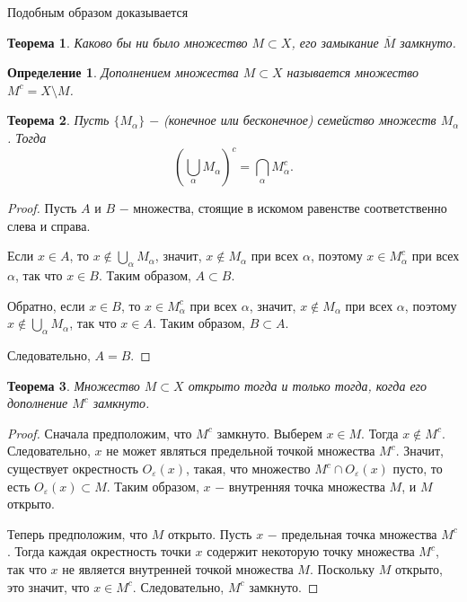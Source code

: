 \documentclass{article}
\newtheorem{theorem}{Теорема}[section]
\newtheorem{definition}{Определение}[section]
\begin{document}
Подобным образом доказывается

\begin{theorem}
Каково бы ни было множество \(M \subset X\), его замыкание \(\overline{M}\) замкнуто.
\end{theorem}

\begin{definition}
Дополнением множества \(M \subset X\) называется множество \(M^c = X \setminus M\).
\end{definition}

\begin{theorem}
Пусть \(\{M_\alpha\}\) \(-\) (конечное или бесконечное) семейство множеств \(M_\alpha\). Тогда
\[
\left(\bigcup\limits_{\alpha} M_\alpha\right)^c = \bigcap\limits_{\alpha}M_\alpha^c.
\]
\end{theorem}

\begin{proof}
Пусть \(A\) и \(B\) \(-\) множества, стоящие в искомом равенстве соответственно слева и справа.

Если \(x \in A\), то \(x \notin \bigcup\limits_{\alpha} M_\alpha\), значит, \(x \notin M_\alpha\) при всех \(\alpha\), поэтому \(x \in M_\alpha^c\) при всех \(\alpha\), так что \(x \in B\). Таким образом, \(A \subset B\).

Обратно, если \(x \in B\), то \(x \in M_\alpha^c\) при всех \(\alpha\), значит, \(x \notin M_\alpha\) при всех \(\alpha\), поэтому \(x \notin \bigcup\limits_{\alpha} M_\alpha\), так что \(x \in A\). Таким образом, \(B \subset A\).

Следовательно, \(A = B\).
\end{proof}

\begin{theorem}
Множество \(M \subset X\) открыто тогда и только тогда, когда его дополнение \(M^c\) замкнуто.
\end{theorem}

\begin{proof}
Сначала предположим, что \(M^c\) замкнуто. Выберем \(x \in M\). Тогда \(x \notin M^c\). Следовательно, \(x\) не может являться предельной точкой множества \(M^c\). Значит, существует окрестность \(O_\varepsilon(x)\), такая, что множество \(M^c \cap O_\varepsilon(x)\) пусто, то есть \(O_\varepsilon(x) \subset M\). Таким образом, \(x\) \(-\) внутренняя точка множества \(M\), и \(M\) открыто.

Теперь предположим, что \(M\) открыто. Пусть \(x\) \(-\) предельная точка множества \(M^c\). Тогда каждая окрестность точки \(x\) содержит некоторую точку множества \(M^c\), так что \(x\) не является внутренней точкой множества \(M\). Поскольку \(M\) открыто, это значит, что \(x \in M^c\). Следовательно, \(M^c\) замкнуто.
\end{proof}
\end{document}
